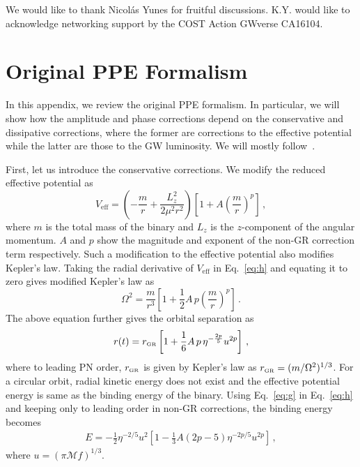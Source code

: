 \documentclass[prd,twocolumn,nofootinbib]{revtex4-1}
\newcommand{\GR}{{\mbox{\tiny GR}}}
\begin{document}
\label{sec:conclusions}

\acknowledgments
We would like to thank Nicol\' as Yunes for fruitful discussions.
K.Y. would like to acknowledge networking support by the COST Action GWverse CA16104.

 \appendix 
 
 \section{Original PPE Formalism}
 \label{appendix}

In this appendix, we review the original PPE formalism. In particular, we will show how the amplitude and phase corrections depend on the conservative and dissipative corrections, where the former are corrections to the effective potential while the latter are those to the GW luminosity. We will mostly follow~\cite{Chatziioannou:2012rf}.

First, let us introduce the conservative corrections. We modify the reduced effective potential as
 \begin{equation}\label{eq:h}
 V_{\text{eff}}=\left(-\frac{m}{r}+\frac{{L}^2_{z}}{2\mu^2r^2}\right)\left[1+A \left(\frac{m}{r}\right)^p\right]\,,
 \end{equation}
where $m$ is the total mass of the binary and $L_{z}$ is the $z$-component of the angular momentum. $A$ and $p$ show the magnitude and exponent of the non-GR correction term respectively. Such a modification to the effective potential also modifies Kepler's law. Taking the radial derivative of $V_{\text{eff}}$ in Eq.~\eqref{eq:h} and equating it to zero gives modified Kepler's law as
 \begin{equation}
 \Omega^2=\frac{m}{r^3} \left[1+\frac{1}{2} A \, p\left(\frac{m}{r}\right)^p\right]\,.
 \end{equation}
 The above equation further gives the orbital separation as
 \begin{equation}\label{eq:g}
 r(t)=r_{\GR}\left[1+\frac{1}{6}A\, p\, \eta^{-\frac{2p}{5}}u^{2p}\right]\,,
 \end{equation}
where to leading PN order, $r_{\GR}$ is given by Kepler's law as $r_{\GR}=(m/\Omega^2)^{1/3}$. For a circular orbit, radial kinetic energy does not exist and the effective potential energy is same as the binding energy of the binary. Using Eq.~\eqref{eq:g} in Eq.~\eqref{eq:h} and keeping only to leading order in non-GR corrections, the binding energy becomes
\begin{align}\label{eq:j}
E=-\frac{1}{2}\eta^{-2/5}u^2\left[1-\frac{1}{3}A(2p-5)\eta^{-2p/5}u^{2p}\right]\,,
\end{align}
where $u=(\pi \mathcal{M} f)^{1/3}$.
\end{document}
